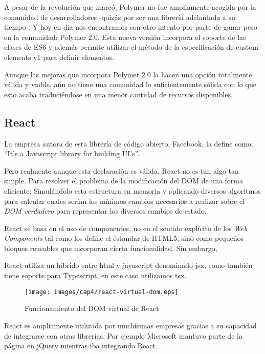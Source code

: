 \bigskip
A pesar de la revolución que marcó, Polymer no fue ampliamente acogida por la comunidad de desarrolladores 
-quizás por ser una librería adelantada a su tiempo-. Y hoy en día nos encontramos con otro intento por 
parte de ganar peso en la comunidad: Polymer 2.0. Esta nueva versión incorpora el soporte de las clases de ES6
y además permite utilizar el método de la especificación de custom elements v1 para definir elementos.

\bigskip
Aunque las mejoras que incorpora Polymer 2.0 la hacen una opción totalmente válida y viable, aún no 
tiene una comunidad lo suficientemente sólida con lo que esto acaba traduciéndose en una menor 
cantidad de recursos disponibles.

\subsection{React}
La empresa autora de esta librería de código abierto, Facebook, la define como: “It’s a Javascript library for building UI’s”. \cite{React}

\bigskip
Pero realmente aunque esta declaración es válida, React no es tan algo tan simple. Para resolver el problema
 de la modificación del DOM de una forma eficiente: Simulándolo esta estructura en memoria y aplicando diversos
 algoritmos para calcular cuales serían los mínimos cambios necesarios a realizar sobre el \textit{DOM verdadero}
 para representar los diversos cambios de estado.

\bigskip
React se basa en el uso de componentes, no en el sentido explícito de los \textit{Web Components} tal como los define 
el éstandar de HTML5, sino como pequeños bloques reusables que incorporan cierta funcionalidad. Sin embargo,


\bigskip
React utiliza un híbrido entre html y javascript denominado jsx, como también tiene soporte para 
Typescript, en este caso utilizamos tsx.

\begin{figure}[!th]
\begin{center}
\texttt{[image: images/cap4/react-virtual-dom.eps]}
\caption{Funcionamiento del DOM virtual de React \cite{ReactVirtualDOM}}
\label{fig:Funcionamiento del DOM virtual de React}
\end{center}
\end{figure}

\bigskip
React es ampliamente utilizada por muchísimas empresas gracias a su capacidad de integrarse con otras librerías. 
Por ejemplo Microsoft mantuvo parte de la página en jQuery mientras iba integrando React.

